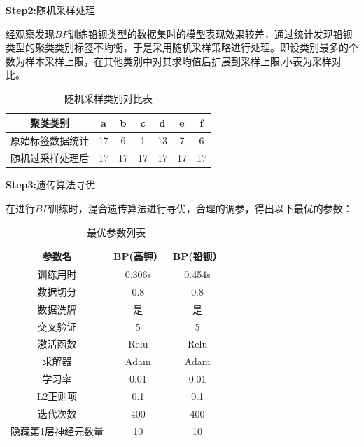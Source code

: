 \documentclass[UTF8]{ctexart}
\begin{document}
        \textbf{Step2:}随机采样处理

        经观察发现$BP$训练铅钡类型的数据集时的模型表现效果较差，通过统计发现铅钡类型的聚类类别标签不均衡，于是采用随机采样策略进行处理。即设类别最多的个数为样本采样上限，在其他类别中对其求均值后扩展到采样上限,小表为采样对比。


        \begin{table}[H]
            \centering
            \caption{随机采样类别对比表}
            \begin{tabular}{|c|c|c|c|c|c|c|}
                \hline
                聚类类别         & a  & b  & c  & d  & e  & f  \\ \hline
                原始标签数据统计 & 17 & 6  & 1  & 13 & 7  & 6  \\ \hline
                随机过采样处理后 & 17 & 17 & 17 & 17 & 17 & 17 \\ \hline
            \end{tabular}
        \end{table}
        \textbf{Step3:}遗传算法寻优

        在进行$BP$训练时，混合遗传算法进行寻优，合理的调参，得出以下最优的参数：

        \begin{table}[H]
            \centering
            \caption{最优参数列表}
            \begin{tabular}{|c|c|c|}
                \hline
                参数名              & BP(高钾） & BP(铅钡） \\ \hline
                训练用时            & 0.306s    & 0.454s    \\ \hline
                数据切分            & 0.8       & 0.8       \\ \hline
                数据洗牌            & 是        & 是        \\ \hline
                交叉验证            & 5         & 5         \\ \hline
                激活函数            & Relu      & Relu      \\ \hline
                求解器              & Adam      & Adam      \\ \hline
                学习率              & 0.01      & 0.01      \\ \hline
                L2正则项            & 0.1       & 0.1       \\ \hline
                迭代次数            & 400       & 400       \\ \hline
                隐藏第1层神经元数量 & 10        & 10        \\ \hline
            \end{tabular}
        \end{table}
\end{document}
